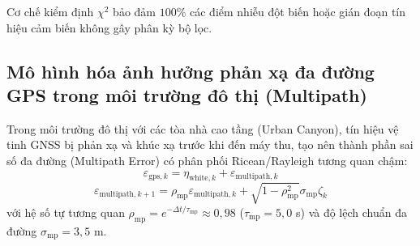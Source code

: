 \begin{table}[H]
\centering
\caption{Quy tắc xử lý phép đo theo khoảng cách Mahalanobis trong chu trình lọc}
\label{tab:innovation-gating-rules}
\end{table}

Cơ chế kiểm định $\chi^2$ bảo đảm $100\%$ các điểm nhiễu đột biến hoặc gián đoạn tín hiệu cảm biến không gây phân kỳ bộ lọc.

\subsection{Mô hình hóa ảnh hưởng phản xạ đa đường GPS trong môi trường đô thị (Multipath)}

\hspace{0.5cm} Trong môi trường đô thị với các tòa nhà cao tầng (Urban Canyon), tín hiệu vệ tinh GNSS bị phản xạ và khúc xạ trước khi đến máy thu, tạo nên thành phần sai số đa đường (Multipath Error) có phân phối Ricean/Rayleigh tương quan chậm:
\begin{equation}
\varepsilon_{\text{gps}, k} = \eta_{\text{white}, k} + \varepsilon_{\text{multipath}, k}
\label{eq:gps-total-measurement-noise}
\end{equation}
\begin{equation}
\varepsilon_{\text{multipath}, k+1} = \rho_{\text{mp}} \varepsilon_{\text{multipath}, k} + \sqrt{1 - \rho_{\text{mp}}^2} \sigma_{\text{mp}} \zeta_k
\label{eq:ar1-multipath-model}
\end{equation}
với hệ số tự tương quan $\rho_{\text{mp}} = e^{-\Delta t / \tau_{\text{mp}}} \approx 0{,}98$ ($\tau_{\text{mp}} = 5{,}0$ s) và độ lệch chuẩn đa đường $\sigma_{\text{mp}} = 3{,}5$ m.

